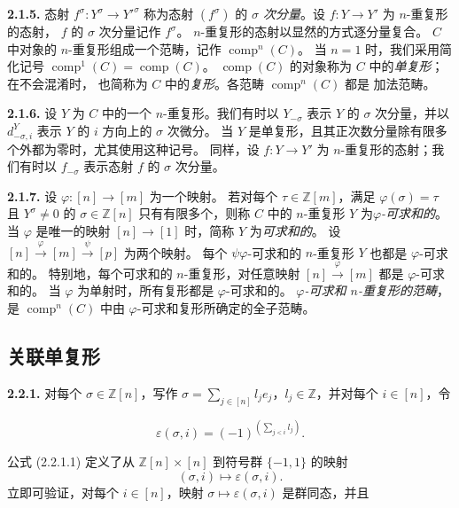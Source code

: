 \clearpage
{}%
\noindent\textbf{2.1.5.}\quad
态射 $f^\sigma\colon Y^\sigma\to Y'^\sigma$ 称为态射 $(f^\sigma)$ 的
\emph{$\sigma$ 次分量}。设 $f\colon Y\to Y'$ 为 $n$-重复形的态射，
$f$ 的 $\sigma$ 次分量记作 $f^\sigma$。
$n$-重复形的态射以显然的方式逐分量复合。
$C$ 中对象的 $n$-重复形组成一个范畴，记作 $\operatorname{comp}^{n}(C)$。
当 $n=1$ 时，我们采用简化记号
$\operatorname{comp}^{1}(C)=\operatorname{comp}(C)$。
$\operatorname{comp}(C)$ 的对象称为 $C$ 中的\emph{单复形}；在不会混淆时，
也简称为 $C$ 中的\emph{复形}。各范畴 $\operatorname{comp}^{n}(C)$ 都是
加法范畴。

\noindent\textbf{2.1.6.}\quad
设 $Y$ 为 $C$ 中的一个 $n$-重复形。我们有时以 $Y_{-\sigma}$ 表示 $Y$ 的
$\sigma$ 次分量，并以 $d^Y_{-\sigma,i}$ 表示 $Y$ 的 $i$ 方向上的
$\sigma$ 次微分。
当 $Y$ 是单复形，且其正次数分量除有限多个外都为零时，尤其使用这种记号。
同样，设 $f\colon Y\to Y'$ 为 $n$-重复形的态射；我们有时以
$f_{-\sigma}$ 表示态射 $f$ 的 $\sigma$ 次分量。

\noindent\textbf{2.1.7.}\quad
设 $\varphi\colon[n]\to[m]$ 为一个映射。
若对每个 $\tau\in\mathbb Z[m]$，满足 $\varphi(\sigma)=\tau$ 且
$Y^\sigma\neq0$ 的 $\sigma\in\mathbb Z[n]$ 只有有限多个，则称 $C$ 中的
$n$-重复形 $Y$ 为\emph{$\varphi$-可求和的}。当 $\varphi$ 是唯一的映射
$[n]\to[1]$ 时，简称 $Y$ 为\emph{可求和的}。
设 $[n]\xrightarrow{\varphi}[m]\xrightarrow{\psi}[p]$ 为两个映射。
每个 $\psi\varphi$-可求和的 $n$-重复形 $Y$ 也都是 $\varphi$-可求和的。
特别地，每个可求和的 $n$-重复形，对任意映射
$[n]\xrightarrow{\varphi}[m]$ 都是 $\varphi$-可求和的。
当 $\varphi$ 为单射时，所有复形都是 $\varphi$-可求和的。
\emph{$\varphi$-可求和 $n$-重复形的范畴}，是
$\operatorname{comp}^{n}(C)$ 中由 $\varphi$-可求和复形所确定的全子范畴。

\subsection{关联单复形}

\noindent\textbf{2.2.1.}\quad
对每个 $\sigma\in\mathbb Z[n]$，写作
$\sigma=\sum_{j\in[n]}l_je_j$，$l_j\in\mathbb Z$，并对每个
$i\in[n]$，令

\begin{equation}
  \varepsilon(\sigma,i)=(-1)^{\left(\sum_{j<i}l_j\right)}.
  \tag{2.2.1.1}
\end{equation}

公式 (2.2.1.1) 定义了从 $\mathbb Z[n]\times[n]$ 到符号群
$\{-1,1\}$ 的映射
\begin{equation*}
  (\sigma,i)\longmapsto\varepsilon(\sigma,i).
\end{equation*}
立即可验证，对每个 $i\in[n]$，映射
$\sigma\longmapsto\varepsilon(\sigma,i)$ 是群同态，并且
